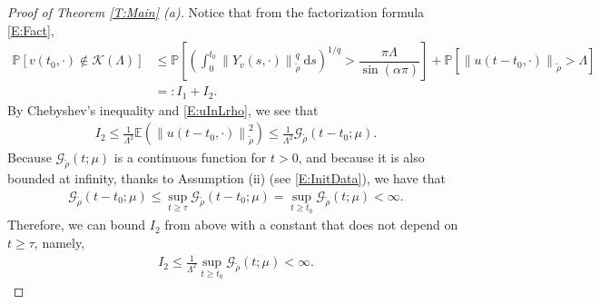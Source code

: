 \documentclass[12pt]{report}
\theoremstyle{plain}
\theoremstyle{definition}
\numberwithin{equation}{section}
\newcommand{\Norm}[1]{\left\|  #1   \right\|}
\newcommand{\ud}{\ensuremath{ \mathrm{d} }}
\begin{document}
\begin{proof}[Proof of Theorem \ref{T:Main} (a)]
	Notice that from the factorization formula \eqref{E:Fact},
	\begin{align*}
	\mathbb{P} \left[ v(t_0,\cdot) \not \in \mathscr{K}(\Lambda) \right ]
	& \le \mathbb{P}\left[ \left(\int_{0}^{t_0} \Norm{Y_v(s,\cdot)}_{\tilde{\rho}}^q \: \ud s\right)^{1/q} > \dfrac{\pi \Lambda}{\sin(\alpha \pi )} \right]
	+ \mathbb{P}\left[ \Norm{u(t-t_0,\cdot)}_{\tilde{\rho}} > \Lambda \right] \\
	& =: I_1+I_2.
	\end{align*}
	By Chebyshev's inequality and \eqref{E:uInLrho}, we see that
	\begin{align*}
	I_2\le\frac{1}{\Lambda^2} \mathbb{E}\left(\Norm{u(t-t_0,\cdot)}_{\tilde{\rho}}^2\right)
	\le \frac{1}{\Lambda^2} \mathcal{G}_{\tilde{\rho}}\left(t-t_0;\mu\right).
	\end{align*}
	Because $\mathcal{G}_{\tilde{\rho}}(t;\mu)$ is a continuous function for $t>0$, and because it
	is also bounded at infinity, thanks to Assumption (ii) (see \eqref{E:InitData}), we have that
	\begin{align} \label{E:GtBdd}
	\mathcal{G}_{\tilde{\rho}}\left(t-t_0;\mu\right)
	\le \sup_{t\ge \tau}  \mathcal{G}_{\tilde{\rho}}\left(t-t_0;\mu\right)
	=   \sup_{t\ge t_0} \mathcal{G}_{\tilde{\rho}}\left(t;\mu\right)<\infty.
	\end{align}
	Therefore, we can bound $I_2$ from above with a constant that does not depend on $t\ge \tau$,
	namely,
	\begin{align*}
	I_2 \le\frac{1}{\Lambda^2}   \sup_{t\ge t_0} \mathcal{G}_{\tilde{\rho}}\left(t;\mu\right)<\infty.
	\end{align*}
	

\end{proof}
\end{document}
